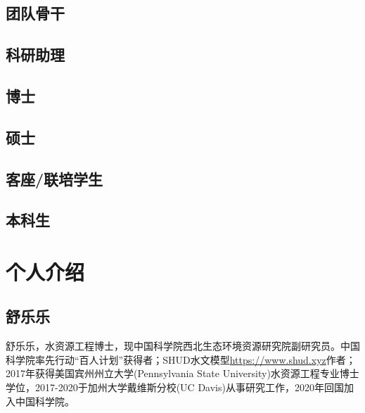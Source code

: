 \documentclass[
]{book}
\begin{document}
\hypertarget{ux56e2ux961fux9aa8ux5e72}{%
\subsection{团队骨干}\label{ux56e2ux961fux9aa8ux5e72}}

\hypertarget{ux79d1ux7814ux52a9ux7406}{%
\subsection{科研助理}\label{ux79d1ux7814ux52a9ux7406}}

\hypertarget{ux535aux58eb}{%
\subsection{博士}\label{ux535aux58eb}}

\hypertarget{ux7855ux58eb}{%
\subsection{硕士}\label{ux7855ux58eb}}

\hypertarget{ux5ba2ux5ea7ux8054ux57f9ux5b66ux751f}{%
\subsection{客座/联培学生}\label{ux5ba2ux5ea7ux8054ux57f9ux5b66ux751f}}

\hypertarget{ux672cux79d1ux751f}{%
\subsection{本科生}\label{ux672cux79d1ux751f}}

\hypertarget{ux4e2aux4ebaux4ecbux7ecd}{%
\section{个人介绍}\label{ux4e2aux4ebaux4ecbux7ecd}}

\hypertarget{ux8212ux4e50ux4e50}{%
\subsection{舒乐乐}\label{ux8212ux4e50ux4e50}}

舒乐乐，水资源工程博士，现中国科学院西北生态环境资源研究院副研究员。中国科学院率先行动``百人计划''获得者；SHUD水文模型\url{https://www.shud.xyz}作者；2017年获得美国宾州州立大学(Pennsylvania State University)水资源工程专业博士学位，2017-2020于加州大学戴维斯分校(UC Davis)从事研究工作，2020年回国加入中国科学院。
\end{document}
